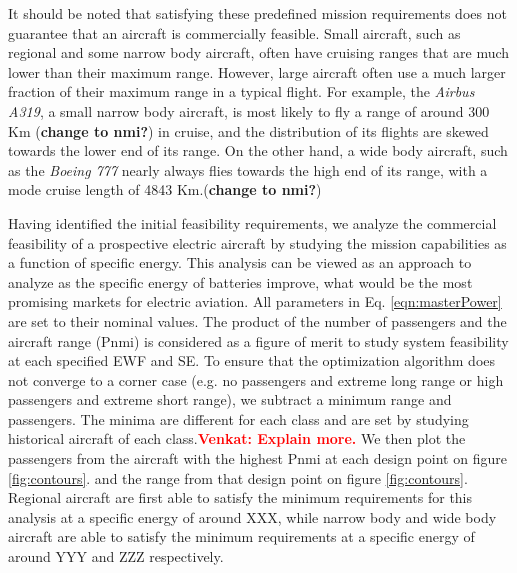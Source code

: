 \documentclass{achemso}
\newcommand{\vv}[1]{{\textbf{\textcolor{red}{Venkat: #1}}}}
\begin{document}
It should be noted that satisfying these predefined mission requirements does not guarantee that an aircraft is commercially feasible. Small aircraft, such as regional and some narrow body aircraft, often have cruising ranges that are much lower than their maximum range. However, large aircraft often use a much larger fraction of their maximum range in a typical flight. For example, the \textit{Airbus A319}, a small narrow body aircraft, is most likely to fly a range of around 300 Km (\textbf{change to nmi?}) in cruise, and the distribution of its flights are skewed towards the lower end of its range. On the other hand, a wide body aircraft, such as the \textit{Boeing 777} nearly always flies towards the high end of its range, with a mode cruise length of 4843 Km.(\textbf{change to nmi?}) \cite{SUN2019118}


Having identified the initial feasibility requirements, we analyze the commercial feasibility of a prospective electric aircraft by studying the mission capabilities as a function of specific energy.  This analysis can be viewed as an approach to analyze as the specific energy of batteries improve, what would be the most promising markets for electric aviation.   All parameters in Eq. \eqref{eqn:masterPower} are set to their nominal values. The product of the number of passengers and the aircraft range (Pnmi) is considered as a figure of merit to study system feasibility at each specified EWF and SE. To ensure that the optimization algorithm does not converge to a corner case (e.g. no passengers and extreme long range or high passengers and extreme short range), we subtract a minimum range and passengers. The minima are different for each class and are set by studying historical aircraft of each class.\vv{Explain more.} We then plot the passengers from the aircraft with the highest Pnmi at each design point on figure \ref{fig:contours}. and the range from that design point on figure \ref{fig:contours}. Regional aircraft are first able to satisfy the minimum requirements for this analysis at a specific energy of around XXX, while narrow body and wide body aircraft are able to satisfy the minimum requirements at a specific energy of around YYY and ZZZ respectively.
\end{document}
